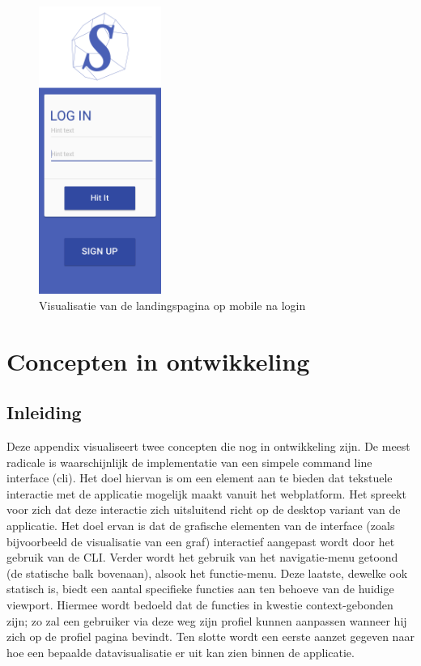 \documentclass{article}
\begin{document}
\begin{appendices}
\begin{figure}[!h]
\centering
 \includegraphics[width=40mm]{pieteruploads/SKRBL_FRNT_MobilePortrait2.png}
 \caption{Visualisatie van de landingspagina op mobile na login }
\end{figure}
\clearpage



\section{Concepten in ontwikkeling}

\subsection{Inleiding}
Deze appendix visualiseert twee concepten die nog in ontwikkeling zijn. De meest radicale is waarschijnlijk de implementatie van een simpele command line interface (cli). Het doel hiervan is om een element aan te bieden dat tekstuele interactie met de applicatie mogelijk maakt vanuit het webplatform. Het spreekt voor zich dat deze interactie zich uitsluitend richt op de desktop variant van de applicatie. Het doel ervan is dat de grafische elementen van de interface (zoals bijvoorbeeld de visualisatie van een graf) interactief aangepast wordt door het gebruik van de CLI. Verder wordt het gebruik van het navigatie-menu getoond (de statische balk bovenaan), alsook het functie-menu. Deze laatste, dewelke ook statisch is, biedt een aantal specifieke functies aan ten behoeve van de huidige viewport. Hiermee wordt bedoeld dat de functies in kwestie context-gebonden zijn; zo zal een gebruiker via deze weg zijn profiel kunnen aanpassen wanneer hij zich op de profiel pagina bevindt. Ten slotte wordt een eerste aanzet gegeven naar hoe een bepaalde datavisualisatie er uit kan zien binnen de applicatie.



\end{appendices}
\end{document}
